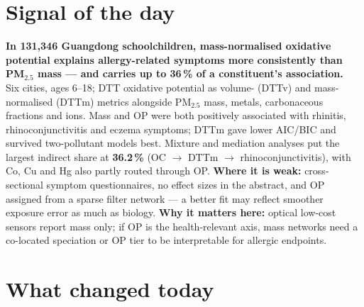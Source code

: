 \documentclass[10pt]{article}
\begin{document}
\vspace{6mm}

\section*{\sffamily\bfseries\color{Deep}Signal of the day}
\vspace{-1.5mm}{\color{Amber}\rule{\linewidth}{1.1pt}}\vspace{2.5mm}

\begin{keybox}
{\sffamily\bfseries\small\color{Deep}In 131,346 Guangdong schoolchildren, mass-normalised oxidative potential
explains allergy-related symptoms more consistently than PM$_{2.5}$ mass --- and carries up to 36\,\% of a
constituent's association.}\\[1.4mm]
\footnotesize
Six cities, ages 6--18; DTT oxidative potential as volume- (DTTv) and mass-normalised (DTTm) metrics alongside
PM$_{2.5}$ mass, metals, carbonaceous fractions and ions. Mass and OP were both positively associated with rhinitis,
rhinoconjunctivitis and eczema symptoms; DTTm gave lower AIC/BIC and survived two-pollutant models best. Mixture
and mediation analyses put the largest indirect share at \textbf{36.2\,\%} (OC $\to$ DTTm $\to$ rhinoconjunctivitis),
with Co, Cu and Hg also partly routed through OP.
\textbf{Where it is weak:} cross-sectional symptom questionnaires, no effect sizes in the abstract, and OP assigned
from a sparse filter network --- a better fit may reflect smoother exposure error as much as biology.
\textbf{Why it matters here:} optical low-cost sensors report mass only; if OP is the health-relevant axis, mass
networks need a co-located speciation or OP tier to be interpretable for allergic endpoints.\par
\end{keybox}

\vspace{3mm}

\section*{\sffamily\bfseries\color{Deep}What changed today}
\vspace{-1.5mm}{\color{Amber}\rule{\linewidth}{1.1pt}}\vspace{2.5mm}
\end{document}
